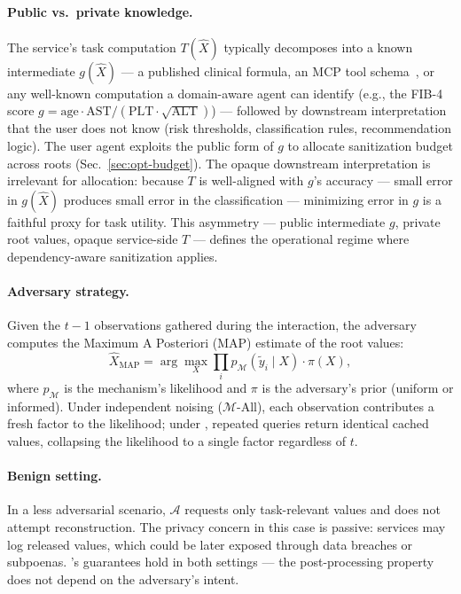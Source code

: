\paragraph{Public vs.\ private knowledge.} The service's task computation $T(\hat{X})$ typically decomposes into a known intermediate $g(\hat{X})$ --- a published clinical formula, an MCP tool schema~\cite{anthropic2024mcp}, or any well-known computation a domain-aware agent can identify (e.g., the FIB-4 score $g = \text{age} \cdot \text{AST} / (\text{PLT} \cdot \sqrt{\text{ALT}})$) --- followed by downstream interpretation that the user does not know (risk thresholds, classification rules, recommendation logic). The user agent exploits the public form of $g$ to allocate sanitization budget across roots (Sec.~\ref{sec:opt-budget}). The opaque downstream interpretation is irrelevant for allocation: because $T$ is well-aligned with $g$'s accuracy --- small error in $g(\hat{X})$ produces small error in the classification --- minimizing error in $g$ is a faithful proxy for task utility. This asymmetry --- public intermediate $g$, private root values, opaque service-side $T$ --- defines the operational regime where dependency-aware sanitization applies.
 
\paragraph{Adversary strategy.} Given the $t - 1$ observations gathered during the interaction, the adversary computes the Maximum A Posteriori (MAP) estimate of the root values:
\[
    \hat{X}_{\mathrm{MAP}} = \arg\max_{X} \prod_{i} p_{\mathcal{M}}(\tilde{y}_i \mid X) \cdot \pi(X),
\]
where $p_{\mathcal{M}}$ is the mechanism's likelihood and $\pi$ is the adversary's prior (uniform or informed). Under independent noising ($\mathcal{M}$-All), each observation contributes a fresh factor to the likelihood; under \sysname{}, repeated queries return identical cached values, collapsing the likelihood to a single factor regardless of $t$.
 
\paragraph{Benign setting.} In a less adversarial scenario, $\mathcal{A}$ requests only task-relevant values and does not attempt reconstruction. The privacy concern in this case is passive: services may log released values, which could be later exposed through data breaches or subpoenas. \sysname{}'s guarantees hold in both settings --- the post-processing property does not depend on the adversary's intent.

